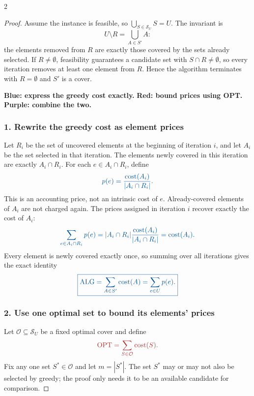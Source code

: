 \documentclass[8pt]{extarticle}
\theoremstyle{definition}
\newcommand{\OPT}{\operatorname{OPT}}
\newcommand{\ALG}{\operatorname{ALG}}
\begin{document}
\begin{multicols*}{2}
\begin{proof}
Assume the instance is feasible, so
$\bigcup_{S\in\mathcal{S}_U}S=U$. The invariant is
\[
  U\setminus R=\bigcup_{A\in S'}A:
\]
the elements removed from $R$ are exactly those covered by the sets already
selected. If $R\neq\emptyset$, feasibility guarantees a candidate set with
$S\cap R\neq\emptyset$, so every iteration removes at least one element from
$R$. Hence the algorithm terminates with $R=\emptyset$ and $S'$ is a cover.

\medskip
\noindent
\textcolor{algblue}{\textbf{Blue: express the greedy cost exactly.}}\quad
\textcolor{optred}{\textbf{Red: bound prices using OPT.}}\quad
\textcolor{bridgepurple}{\textbf{Purple: combine the two.}}

\subsubsection*{\textcolor{algblue}{1. Rewrite the greedy cost as element prices}}

Let $R_i$ be the set of uncovered elements at the beginning of iteration $i$,
and let $A_i$ be the set selected in that iteration. The elements newly
covered in this iteration are exactly $A_i\cap R_i$. For each
$e\in A_i\cap R_i$, define
\[
  \color{algblue}
  p(e)=\frac{\operatorname{cost}(A_i)}{|A_i\cap R_i|}.
\]
This is an accounting price, not an intrinsic cost of $e$. Already-covered
elements of $A_i$ are not charged again. The prices assigned in iteration
$i$ recover exactly the cost of $A_i$:
\[
  \color{algblue}
  \sum_{e\in A_i\cap R_i}p(e)
  =|A_i\cap R_i|\frac{\operatorname{cost}(A_i)}{|A_i\cap R_i|}
  =\operatorname{cost}(A_i).
\]
Every element is newly covered exactly once, so summing over all iterations
gives the exact identity
\[
  \color{algblue}
  \boxed{\ALG=\sum_{A\in S'}\operatorname{cost}(A)
  =\sum_{e\in U}p(e).}
\]

\subsubsection*{\textcolor{optred}{2. Use one optimal set to bound its elements' prices}}

Let $\mathcal{O}\subseteq\mathcal{S}_U$ be a fixed optimal cover and define
\[
  \color{optred}
  \OPT=\sum_{S\in\mathcal{O}}\operatorname{cost}(S).
\]
Fix any one set $S^*\in\mathcal{O}$ and let $m=|S^*|$. The set $S^*$ may or
may not also be selected by greedy; the proof only needs it to be an available
candidate for comparison.


\end{proof}
\end{multicols*}
\end{document}
